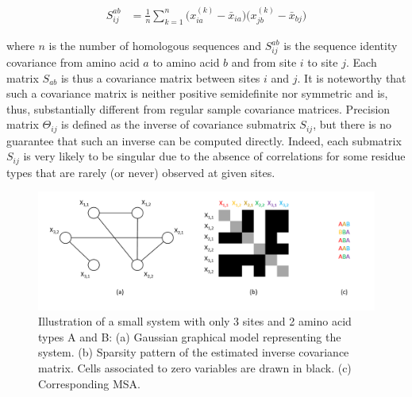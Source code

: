         \begin{equation} \label{covariance}
            \begin{split}
                S_{ij}^{ab} & = \frac{1}{n} \sum\limits_{k=1}^{n} \big( x_{ia}^{(k)} - \bar{x}_{ia} \big) \big( x_{jb}^{(k)} - \bar{x}_{bj} \big)
            \end{split}
        \end{equation}

        where $n$ is the number of
        homologous sequences and $S_{ij}^{ab}$ is the sequence identity covariance from amino acid
        $a$ to amino acid $b$ and from site $i$ to site $j$.
        Each matrix $S_{ab}$ is thus a covariance matrix between sites $i$ and $j$.
        It is noteworthy that such a covariance matrix is neither positive
        semidefinite nor symmetric and is, thus, substantially different from regular sample covariance matrices.
        Precision matrix $\Theta_{ij}$ is defined as
        the inverse of covariance submatrix $S_{ij}$, but there is no guarantee that such an inverse can be computed directly.
        Indeed, each submatrix $S_{ij}$ is very likely to be singular due to the absence
        of correlations for some residue types that are rarely (or never) observed at given sites.


        \begin{figure}[H]
            \begin{center}
                \includegraphics[width=\textwidth, keepaspectratio]{imgs/ggm.png}
                \caption{Illustration of a small system with only 3 sites and 2 amino acid types A and B:
                    (a) Gaussian graphical model representing the system.
                    (b) Sparsity pattern of the estimated inverse covariance matrix.
                    Cells associated to zero variables are drawn in black. (c) Corresponding MSA.}
                \label{thresholds}
            \end{center}
        \end{figure}

